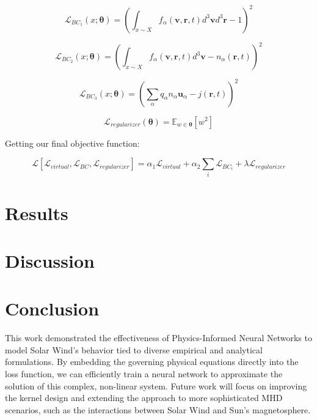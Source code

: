 \documentclass[12pt]{article}
\begin{document}
\begin{equation}
    \mathcal{L}_{BC_1} \left(x; \mathbf{\theta}\right) = \left(\int_{x \sim X} f_\alpha (\mathbf{v}, \mathbf{r}, t) d^3\mathbf{v} d^3\mathbf{r} - 1\right)^2
\end{equation}

\begin{equation}
    \mathcal{L}_{BC_2} \left(x; \mathbf{\theta}\right) = \left(\int_{x \sim X} f_\alpha (\mathbf{v}, \mathbf{r}, t) d^3\mathbf{v} - n_\alpha(\mathbf{r}, t) \right)^2
\end{equation}

\begin{equation}
    \mathcal{L}_{BC_3} \left(x; \mathbf{\theta}\right) = \left(\sum_{\alpha} q_\alpha n_\alpha  \mathbf{u}_\alpha- j(\mathbf{r}, t) \right)^2
\end{equation}

\begin{equation}
    \mathcal{L}_{regularizer} \left( \mathbf{\theta} \right) = \mathbb{E}_{w \in \mathbf{\theta}}\left[ w ^ 2 \right]
\end{equation}

Getting our final objective function:

\begin{equation}
    \mathcal{L}\left[\mathcal{L}_{virtual}, \mathcal{L}_{BC}, \mathcal{L}_{regularizer}\right] = \alpha_1 \mathcal{L}_{virtual} + \alpha_2 \sum_{i} \mathcal{L}_{BC_i} + \lambda \mathcal{L}_{regularizer}
\end{equation}

\section{Results}

\section{Discussion}

\section{Conclusion}
This work demonstrated the effectiveness of Physics-Informed Neural Networks to model Solar Wind's behavior tied to diverse empirical and analytical formulations. By embedding the governing physical equations directly into the loss function, we can efficiently train a neural network to approximate the solution of this complex, non-linear system. Future work will focus on improving the kernel design and extending the approach to more sophisticated MHD scenarios, such as the interactions between Solar Wind and Sun's magnetosphere.




\end{document}
